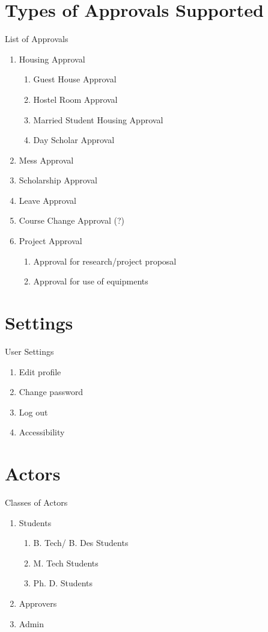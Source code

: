 \documentclass{beamer}
\begin{document}
\section{Types of Approvals Supported}
\begin{frame}{List of Approvals}
\begin{enumerate}
\item Housing Approval
\begin{enumerate}
\item Guest House Approval
\item Hostel Room Approval
\item Married Student Housing Approval
\item Day Scholar Approval
\end{enumerate}
\item Mess Approval
\item Scholarship Approval
\item Leave Approval
\item Course Change Approval (?)
\item Project Approval
\begin{enumerate}
\item Approval for research/project proposal
\item Approval for use of equipments
\end{enumerate}
\end{enumerate}
\end{frame}

\section{Settings}
\begin{frame}{User Settings}
\begin{enumerate}
\item Edit profile
\item Change password
\item Log out
\item Accessibility
\end{enumerate}
\end{frame}

\section{Actors}
\begin{frame}{Classes of Actors}
\begin{enumerate}
\item Students
\begin{enumerate}
\item B. Tech/ B. Des Students
\item M. Tech Students
\item Ph. D. Students
\end{enumerate}
\item Approvers
\item Admin
\end{enumerate}
\end{frame}
\end{document}
